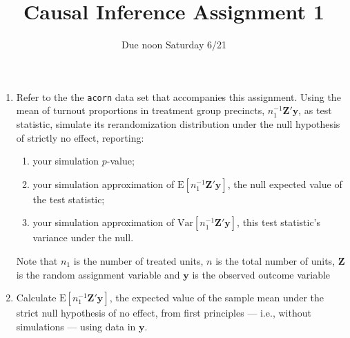 \documentclass{article}
\title{Causal Inference Assignment 1}
\author{Due  noon Saturday 6/21}
\begin{document}
\maketitle

\begin{enumerate}
\item Refer to the the \texttt{acorn} data set that accompanies this assignment.  Using the mean of turnout proportions in
treatment group precincts, $n_{1}^{-1}\mathbf{Z}'\mathbf{y}$, as
test statistic, simulate its rerandomization distribution under the
null hypothesis of strictly no effect, reporting: \label{q:simmoments}
\begin{enumerate}
  \item your simulation $p$-value; 
  \item your simulation approximation of $\mathrm{E}[
    n_{1}^{-1}\mathbf{Z}'\mathbf{y}]$, the null expected value of the test
    statistic; 
  \item your simulation approximation of
    $\mathrm{Var}[n_{1}^{-1}\mathbf{Z}'\mathbf{y}]$, this test
    statistic's variance under the null.
  \end{enumerate}
 Note that $n_1$ is the number of treated units, $n$ is the total number of units, $\mathbf{Z}$ is the random assignment variable and $\mathbf{y}$ is the observed outcome variable
\item Calculate $\mathrm{E} [ n_{1}^{-1}\mathbf{Z}'\mathbf{y} ]$, the expected value of the
  sample mean under the strict null hypothesis of no effect, from first principles --- i.e., without simulations ---  using data in $\mathbf{y}$.  \label{q:exactEV}

\end{enumerate}
\end{document}
